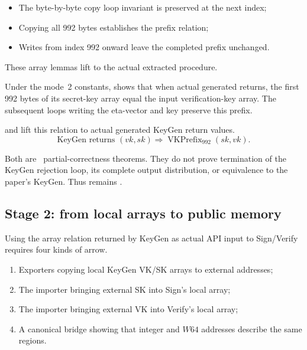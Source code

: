 \begin{itemize}
  \item The byte-by-byte copy loop invariant is preserved at the next index;
  \item Copying all 992 bytes establishes the prefix relation;
  \item Writes from index 992 onward leave the completed prefix unchanged.
\end{itemize}

These array lemmas lift to the actual extracted procedure.

\begin{verified}
Under the mode~2 constants,
 shows that when actual generated
 returns, the first 992 bytes of its secret-key array
equal the input verification-key array. The subsequent loops writing the
eta-vector and key preserve this prefix.
\end{verified}

\begin{verified}
 and
 lift this relation to actual
generated KeyGen return values.
\[
  \text{KeyGen returns }(vk,sk)
  \Longrightarrow \operatorname{VKPrefix}_{992}(sk,vk).
\]
\end{verified}

Both are \statusproved\ partial-correctness theorems. They do not prove
termination of the KeyGen rejection loop, its complete output distribution,
or equivalence to the paper's KeyGen. Thus  remains
\statuspartial.

\subsection{Stage 2: from local arrays to public memory}

Using the array relation returned by KeyGen as actual API input to Sign/Verify
requires four kinds of arrow.

\begin{enumerate}
  \item Exporters copying local KeyGen VK/SK arrays to external addresses;
  \item The importer bringing external SK into Sign's local array;
  \item The importer bringing external VK into Verify's local array;
  \item A canonical bridge showing that integer and \(W64\) addresses
        describe the same regions.
\end{enumerate}

